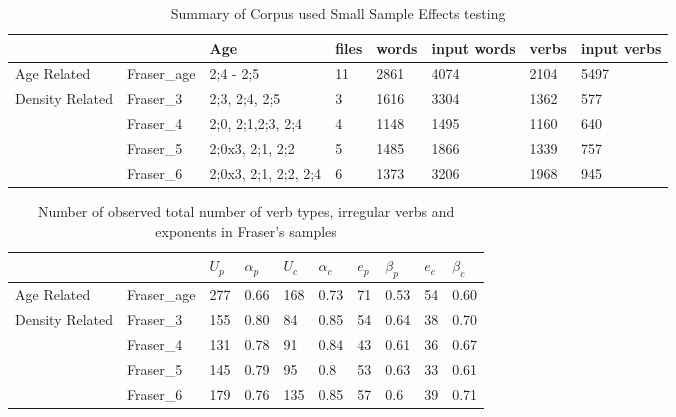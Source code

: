 \begin{table}[htb]
\centering
\caption{Summary of Corpus used Small Sample Effects testing}
\label{table:FraserSum}
\begin{tabular}{llllllll}
\hline
& & Age & files & words & input words & verbs & input verbs \\
\toprule
Age Related & Fraser_{age} & 2;4 - 2;5 & 11 & 2861 & 4074& 2104&5497\\
\hline 
Density Related & Fraser_3 & 2;3, 2;4, 2;5 & 3 & 1616 & 3304 & 1362 & 577 \\
& Fraser_4 & 2;0, 2;1,2;3, 2;4 & 4 & 1148 & 1495 & 1160 & 640\\
& Fraser_5 & 2;0x3, 2;1, 2;2 & 5 & 1485 & 1866 & 1339 & 757\\
& Fraser_6 & 2;0x3, 2;1, 2;2, 2;4& 6 & 1373 & 3206 & 1968 & 945\\
\bottomrule
\end{tabular}
\end{table}

\begin{table}[htb]
\centering
\caption{Number of observed total number of verb types, irregular verbs and exponents in Fraser's samples}
\label{table:FraserB}

\begin{tabular}{llllllllll}
\toprule
& & $U_p$ & $\alpha_p$ & $U_c$ & $\alpha_c$ & $e_p$ & $\beta_p$ & $e_c$ & $\beta_c$ \\
\hline
Age Related & Fraser_{age} & 277 & 0.66& 168& 0.73&71& 0.53& 54&0.60\\
\hline
Density Related &Fraser_3 & 155 & 0.80 & 84 & 0.85 & 54 & 0.64 & 38 & 0.70\\
&Fraser_4 & 131 & 0.78 & 91 & 0.84 & 43 & 0.61 & 36 & 0.67\\
&Fraser_5 & 145 & 0.79  & 95  & 0.8  & 53  & 0.63  & 33  &0.61\\
&Fraser_6 & 179 & 0.76 & 135 & 0.85 & 57 & 0.6 & 39 & 0.71\\
\bottomrule
\end{tabular}
\end{table}

